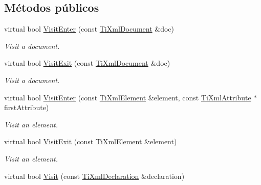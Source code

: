 \subsection*{\-Métodos públicos}
\begin{DoxyCompactItemize}
\item 
\hypertarget{classTiXmlPrinter_a2ec73087db26ff4d2c4316c56f861db7}{virtual bool \hyperlink{classTiXmlPrinter_a2ec73087db26ff4d2c4316c56f861db7}{\-Visit\-Enter} (const \hyperlink{classTiXmlDocument}{\-Ti\-Xml\-Document} \&doc)}\label{classTiXmlPrinter_a2ec73087db26ff4d2c4316c56f861db7}

\begin{DoxyCompactList}\small\item\em \-Visit a document. \end{DoxyCompactList}\item 
\hypertarget{classTiXmlPrinter_a0a636046fa589b6d7f3e5bd025b3f33e}{virtual bool \hyperlink{classTiXmlPrinter_a0a636046fa589b6d7f3e5bd025b3f33e}{\-Visit\-Exit} (const \hyperlink{classTiXmlDocument}{\-Ti\-Xml\-Document} \&doc)}\label{classTiXmlPrinter_a0a636046fa589b6d7f3e5bd025b3f33e}

\begin{DoxyCompactList}\small\item\em \-Visit a document. \end{DoxyCompactList}\item 
\hypertarget{classTiXmlPrinter_a6dccaf5ee4979f13877690afe28721e8}{virtual bool \hyperlink{classTiXmlPrinter_a6dccaf5ee4979f13877690afe28721e8}{\-Visit\-Enter} (const \hyperlink{classTiXmlElement}{\-Ti\-Xml\-Element} \&element, const \hyperlink{classTiXmlAttribute}{\-Ti\-Xml\-Attribute} $\ast$first\-Attribute)}\label{classTiXmlPrinter_a6dccaf5ee4979f13877690afe28721e8}

\begin{DoxyCompactList}\small\item\em \-Visit an element. \end{DoxyCompactList}\item 
\hypertarget{classTiXmlPrinter_ae6a1df8271df4bf62d7873c38e34aa69}{virtual bool \hyperlink{classTiXmlPrinter_ae6a1df8271df4bf62d7873c38e34aa69}{\-Visit\-Exit} (const \hyperlink{classTiXmlElement}{\-Ti\-Xml\-Element} \&element)}\label{classTiXmlPrinter_ae6a1df8271df4bf62d7873c38e34aa69}

\begin{DoxyCompactList}\small\item\em \-Visit an element. \end{DoxyCompactList}\item 
\hypertarget{classTiXmlPrinter_adaf7eec4dc43ad071ff52b60361574f5}{virtual bool \hyperlink{classTiXmlPrinter_adaf7eec4dc43ad071ff52b60361574f5}{\-Visit} (const \hyperlink{classTiXmlDeclaration}{\-Ti\-Xml\-Declaration} \&declaration)}\label{classTiXmlPrinter_adaf7eec4dc43ad071ff52b60361574f5}


\end{DoxyCompactItemize}

